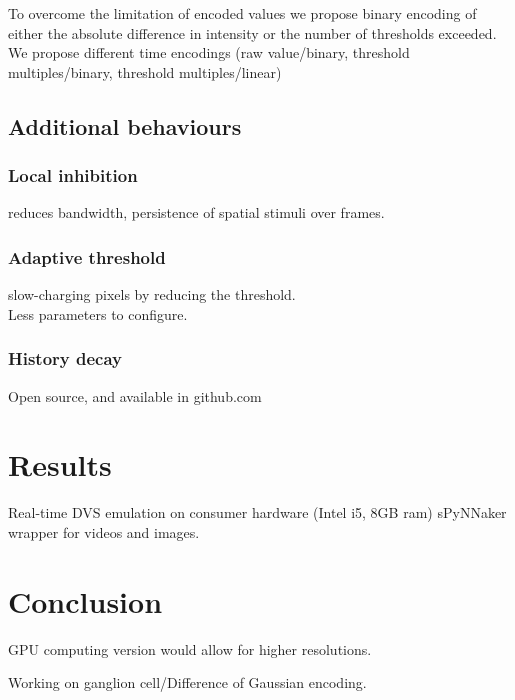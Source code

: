 \documentclass[twocolumn]{article}
\begin{document}
  To overcome the limitation of encoded values we propose binary encoding of either the absolute difference in intensity or the number of thresholds exceeded. 
  We propose different time encodings (raw value/binary, threshold multiples/binary, threshold multiples/linear)\\
  
  \subsection{Additional behaviours}
  \subsubsection{Local inhibition} reduces bandwidth, persistence of spatial stimuli over frames. 
  \subsubsection{Adaptive threshold} slow-charging pixels by reducing the threshold.\\
  Less parameters to configure.
  \subsubsection{History decay}
  Open source, and available in github.com\\
  
  \section{Results}
  
  Real-time DVS emulation on consumer hardware (Intel i5, 8GB ram)
  sPyNNaker wrapper for videos and images.
  
  \section{Conclusion}
  
  GPU computing version would allow for higher resolutions.
  
  Working on ganglion cell/Difference of Gaussian encoding.
  
  \printbibliography
\end{document}
